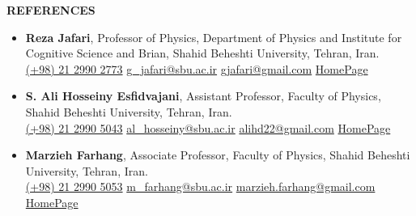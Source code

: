 \documentclass[12pt, b4paper]{cv}
\begin{document}

{\Large \textbf{REFERENCES}}
\vspace{-5pt}

\begin{itemize}
	\item \textbf{Reza Jafari}, Professor of Physics, Department of Physics and Institute for Cognitive Science and Brian, Shahid Beheshti University, Tehran, Iran.\\
	\href{tel:(+98)2129902773}{ (+98) 21 2990 2773}
	\hspace{0.5in}
	\href{mailto:g\_jafari@sbu.ac.ir}{ g\_jafari@sbu.ac.ir}
	\hspace{0.75in}
	\href{mailto:gjafari@gmail.com}{ gjafari@gmail.com}
	\hspace{1.14in}
	\href{https://complexity.sbu.ac.ir/professor-reza-jafari/}{HomePage} 
	\item \textbf{S. Ali Hosseiny Esfidvajani}, Assistant Professor, Faculty of Physics, Shahid Beheshti University, Tehran, Iran.\\
	\href{tel:(+98)2129905043}{ (+98) 21 2990 5043}
	\hspace{0.5in}
	\href{mailto:al\_hosseiny@sbu.ac.ir}{ al\_hosseiny@sbu.ac.ir}
	\hspace{0.5in}
	\href{mailto:alihd22@gmail.com}{ alihd22@gmail.com}
	\hspace{1.091in}
	\href{https://alihosseiny.com/}{HomePage} 
	\item \textbf{Marzieh Farhang}, Associate Professor, Faculty of Physics, Shahid Beheshti University, Tehran, Iran.\\
	\href{tel:(+98)2129905053}{ (+98) 21 2990 5053}
	\hspace{0.5in}
	\href{mailto:m\_farhang@sbu.ac.ir}{ m\_farhang@sbu.ac.ir}
	\hspace{0.54in}
	\href{mailto:marzieh.farhang@gmail.com}{ marzieh.farhang@gmail.com}
	\hspace{0.5in}
	\href{https://en.sbu.ac.ir/~m_farhang/home}{HomePage} 
\end{itemize}
\end{document}
